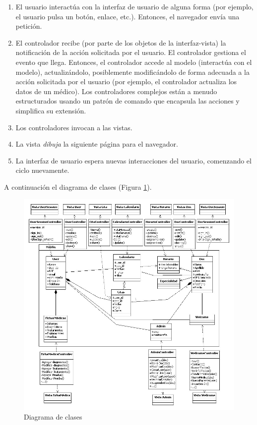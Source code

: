 			\begin{enumerate}
				\item El usuario interactúa con la interfaz de usuario de alguna forma (por ejemplo, el usuario pulsa un botón, enlace, etc.). Entonces, el navegador envía una petición.
				\item El controlador recibe (por parte de los objetos de la interfaz-vista) la notificación de la acción solicitada por el usuario. El controlador gestiona el evento que llega. Entonces, el controlador accede al modelo (interactúa con el modelo), actualizándolo, posiblemente modificándolo de forma adecuada a la acción solicitada por el usuario (por ejemplo, el controlador actualiza los datos de un médico). Los controladores complejos están a menudo estructurados usando un patrón de comando que encapsula las acciones y simplifica su extensión.
				\item Los controladores invocan a las vistas.
				\item La vista \textit{dibuja} la siguiente página para el navegador.
				\item La interfaz de usuario espera nuevas interacciones del usuario, comenzando el ciclo nuevamente.
			\end{enumerate}

			A continuación el diagrama de clases (Figura \ref{fig:dis_clases}).

			\begin{figure}[H]
			  \centering
			    \includegraphics[width=16cm]{img/jpg/dis_clases/clases.jpg}
			  \caption{Diagrama de clases}
			  \label{fig:dis_clases}
			\end{figure}

